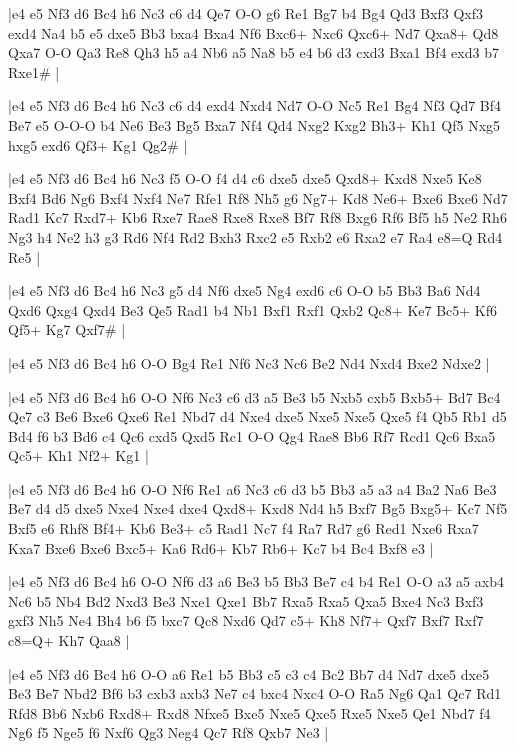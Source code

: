 \whitename{}
\blackname{}
\makegametitle
|e4 e5 Nf3 d6 Bc4 h6 Nc3 c6 d4 Qe7 O-O g6 Re1 Bg7 b4 Bg4 Qd3 Bxf3 Qxf3 exd4 Na4 b5 e5 dxe5 Bb3 bxa4 Bxa4 Nf6 Bxc6+ Nxc6 Qxc6+ Nd7 Qxa8+ Qd8 Qxa7 O-O Qa3 Re8 Qh3 h5 a4 Nb6 a5 Na8 b5 e4 b6 d3 cxd3 Bxa1 Bf4 exd3 b7 Rxe1\#  |

\whitename{}
\blackname{}
\makegametitle
|e4 e5 Nf3 d6 Bc4 h6 Nc3 c6 d4 exd4 Nxd4 Nd7 O-O Nc5 Re1 Bg4 Nf3 Qd7 Bf4 Be7 e5 O-O-O b4 Ne6 Be3 Bg5 Bxa7 Nf4 Qd4 Nxg2 Kxg2 Bh3+ Kh1 Qf5 Nxg5 hxg5 exd6 Qf3+ Kg1 Qg2\#  |

\whitename{}
\blackname{}
\makegametitle
|e4 e5 Nf3 d6 Bc4 h6 Nc3 f5 O-O f4 d4 c6 dxe5 dxe5 Qxd8+ Kxd8 Nxe5 Ke8 Bxf4 Bd6 Ng6 Bxf4 Nxf4 Ne7 Rfe1 Rf8 Nh5 g6 Ng7+ Kd8 Ne6+ Bxe6 Bxe6 Nd7 Rad1 Kc7 Rxd7+ Kb6 Rxe7 Rae8 Rxe8 Rxe8 Bf7 Rf8 Bxg6 Rf6 Bf5 h5 Ne2 Rh6 Ng3 h4 Ne2 h3 g3 Rd6 Nf4 Rd2 Bxh3 Rxc2 e5 Rxb2 e6 Rxa2 e7 Ra4 e8=Q Rd4 Re5  |

\whitename{}
\blackname{}
\makegametitle
|e4 e5 Nf3 d6 Bc4 h6 Nc3 g5 d4 Nf6 dxe5 Ng4 exd6 c6 O-O b5 Bb3 Ba6 Nd4 Qxd6 Qxg4 Qxd4 Be3 Qe5 Rad1 b4 Nb1 Bxf1 Rxf1 Qxb2 Qc8+ Ke7 Bc5+ Kf6 Qf5+ Kg7 Qxf7\#  |

\whitename{}
\blackname{}
\makegametitle
|e4 e5 Nf3 d6 Bc4 h6 O-O Bg4 Re1 Nf6 Nc3 Nc6 Be2 Nd4 Nxd4 Bxe2 Ndxe2  |

\whitename{}
\blackname{}
\makegametitle
|e4 e5 Nf3 d6 Bc4 h6 O-O Nf6 Nc3 c6 d3 a5 Be3 b5 Nxb5 cxb5 Bxb5+ Bd7 Bc4 Qe7 c3 Be6 Bxe6 Qxe6 Re1 Nbd7 d4 Nxe4 dxe5 Nxe5 Nxe5 Qxe5 f4 Qb5 Rb1 d5 Bd4 f6 b3 Bd6 c4 Qc6 cxd5 Qxd5 Rc1 O-O Qg4 Rae8 Bb6 Rf7 Rcd1 Qc6 Bxa5 Qc5+ Kh1 Nf2+ Kg1  |

\whitename{}
\blackname{}
\makegametitle
|e4 e5 Nf3 d6 Bc4 h6 O-O Nf6 Re1 a6 Nc3 c6 d3 b5 Bb3 a5 a3 a4 Ba2 Na6 Be3 Be7 d4 d5 dxe5 Nxe4 Nxe4 dxe4 Qxd8+ Kxd8 Nd4 h5 Bxf7 Bg5 Bxg5+ Kc7 Nf5 Bxf5 e6 Rhf8 Bf4+ Kb6 Be3+ c5 Rad1 Nc7 f4 Ra7 Rd7 g6 Red1 Nxe6 Rxa7 Kxa7 Bxe6 Bxe6 Bxc5+ Ka6 Rd6+ Kb7 Rb6+ Kc7 b4 Bc4 Bxf8 e3  |

\whitename{}
\blackname{}
\makegametitle
|e4 e5 Nf3 d6 Bc4 h6 O-O Nf6 d3 a6 Be3 b5 Bb3 Be7 c4 b4 Re1 O-O a3 a5 axb4 Nc6 b5 Nb4 Bd2 Nxd3 Be3 Nxe1 Qxe1 Bb7 Rxa5 Rxa5 Qxa5 Bxe4 Nc3 Bxf3 gxf3 Nh5 Ne4 Bh4 b6 f5 bxc7 Qc8 Nxd6 Qd7 c5+ Kh8 Nf7+ Qxf7 Bxf7 Rxf7 c8=Q+ Kh7 Qaa8  |

\whitename{}
\blackname{}
\makegametitle
|e4 e5 Nf3 d6 Bc4 h6 O-O a6 Re1 b5 Bb3 c5 c3 c4 Bc2 Bb7 d4 Nd7 dxe5 dxe5 Be3 Be7 Nbd2 Bf6 b3 cxb3 axb3 Ne7 c4 bxc4 Nxc4 O-O Ra5 Ng6 Qa1 Qc7 Rd1 Rfd8 Bb6 Nxb6 Rxd8+ Rxd8 Nfxe5 Bxe5 Nxe5 Qxe5 Rxe5 Nxe5 Qe1 Nbd7 f4 Ng6 f5 Nge5 f6 Nxf6 Qg3 Neg4 Qc7 Rf8 Qxb7 Ne3  |

